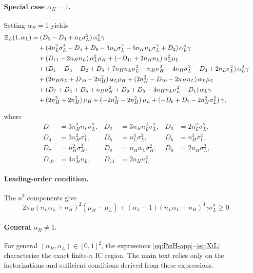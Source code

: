 \documentclass[a4paper,12pt]{article}
\theoremstyle{definition}
\theoremstyle{remark}
\newcommand{\1}{\mathbf{1}}
\begin{document}
\paragraph{Special case $\alpha_H=1$.}
Setting $\alpha_H = 1$ yields
\begin{align}
    \Xi_L(1,\alpha_L)
    &= (D_5 - D_3 + n_L \sigma_L^2)\,\alpha_L^4 \gamma \notag\\
    &\quad + (4 n_L^2 \sigma_L^2 - D_5 + D_9 - 3 n_L \sigma_L^2 - 5 n_H n_L \sigma_L^2 + D_2)\,\alpha_L^3 \gamma \notag\\
    &\quad + (D_{11} - 2 n_H n_L)\,\alpha_L^2 \mu_H + (-D_{11} + 2 n_H n_L)\,\alpha_L^2 \mu_L \notag\\
    &\quad + (D_1 - D_4 - D_2 + D_8 + 7 n_H n_L \sigma_L^2 - n_H \sigma_H^2 - 4 n_H \sigma_L^2 - D_3 + 2 n_L \sigma_L^2)\,\alpha_L^2 \gamma \notag\\
    &\quad + (2 n_H n_L + D_{10} - 2 n_H^2)\,\alpha_L \mu_H + (2 n_H^2 - D_{10} - 2 n_H n_L)\,\alpha_L \mu_L \notag\\
    &\quad + (D_7 + D_4 + D_6 + n_H \sigma_H^2 + D_9 + D_8 - 4 n_H n_L \sigma_L^2 - D_1)\,\alpha_L \gamma \notag\\
    &\quad + (2 n_H^3 + 2 n_H^2)\,\mu_H + (-2 n_H^3 - 2 n_H^2)\,\mu_L + (-D_6 + D_7 - 2 n_H^2 \sigma_L^2)\,\gamma, \label{eq:XiL-special}
\end{align}

where
\begin{align*}
    D_1 &= 3 n_H^2 n_L \sigma_L^2, &
    D_2 &= 3 n_H n_L^2 \sigma_L^2, &
    D_3 &= 2 n_L^2 \sigma_L^2, \\
    D_4 &= 3 n_H^2 \sigma_L^2, &
    D_5 &= n_L^3 \sigma_L^2, &
    D_6 &= n_H^3 \sigma_L^2, \\
    D_7 &= n_H^2 \sigma_H^2, &
    D_8 &= n_H n_L \sigma_H^2, &
    D_9 &= 2 n_H \sigma_L^2, \\
    D_{10} &= 4 n_H^2 n_L, &
    D_{11} &= 2 n_H n_L^2.
\end{align*}

\paragraph{Leading-order condition.}
The $n^3$ components give
\begin{equation}\label{eq:IC-L-leading}
    2 n_H (n_L \alpha_L + n_H)^2 (\mu_H - \mu_L)
    + (\alpha_L - 1)(n_L \alpha_L + n_H)^3 \gamma \sigma_L^2 \ge 0.
\end{equation}

\paragraph{General $\alpha_H \neq 1$.}
For general $(\alpha_H,\alpha_L)\in[0,1]^2$, the expressions
\eqref{eq:PsiH-app}--\eqref{eq:XiL} characterize the exact finite-$n$ IC region.
The main text relies only on the factorizations and sufficient conditions
derived from these expressions.
\end{document}
